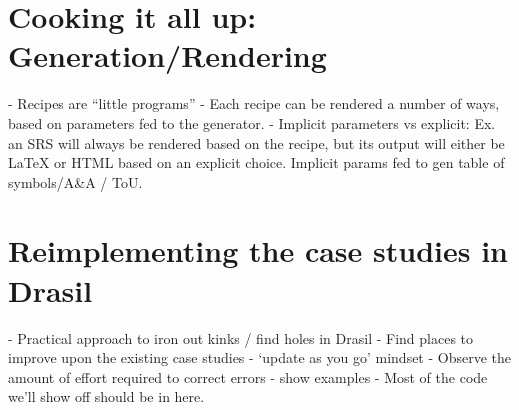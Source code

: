 \section{Cooking it all up: Generation/Rendering}
  - Recipes are “little programs”
  - Each recipe can be rendered a number of ways, based on parameters fed to the generator.
  -  Implicit parameters vs explicit: Ex. an SRS will always be rendered based on the recipe, but its output will either be LaTeX or HTML based on an explicit choice. Implicit params fed to gen table of symbols/A\&A / ToU.


\section{Reimplementing the case studies in Drasil}
  - Practical approach to iron out kinks / find holes in Drasil
  - Find places to improve upon the existing case studies - ‘update as you go’ mindset
  - Observe the amount of effort required to correct errors - show examples
  - Most of the code we’ll show off should be in here.